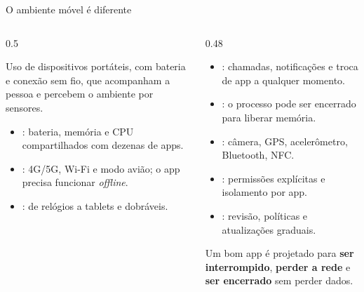 \documentclass[aspectratio=169,10pt]{beamer}
\begin{document}
\begin{frame}{O ambiente móvel é diferente}
  \begin{columns}[T]
    \begin{column}{0.5\textwidth}
      \begin{definicao}
        Uso de dispositivos portáteis, com bateria e conexão sem fio, que acompanham a pessoa e percebem o ambiente por sensores.
      \end{definicao}
      \begin{itemize}
        \small
        \item {}: bateria, memória e CPU compartilhados com dezenas de apps.
        \item {}: 4G/5G, Wi-Fi e modo avião; o app precisa funcionar \emph{offline}.
        \item {}: de relógios a tablets e dobráveis.
      \end{itemize}
    \end{column}
    \begin{column}{0.48\textwidth}
      \begin{itemize}
        \small
        \item {}: chamadas, notificações e troca de app a qualquer momento.
        \item {}: o processo pode ser encerrado para liberar memória.
        \item {}: câmera, GPS, acelerômetro, Bluetooth, NFC.
        \item {}: permissões explícitas e isolamento por app.
        \item {}: revisão, políticas e atualizações graduais.
      \end{itemize}
      \begin{atencao}
        Um bom app é projetado para \textbf{ser interrompido}, \textbf{perder a rede} e \textbf{ser encerrado} sem perder dados.
      \end{atencao}
    \end{column}
  \end{columns}
\end{frame}
\end{document}

